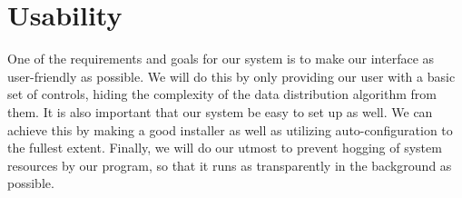 \section{Usability}
	One of the requirements and goals for our system is to make our interface as user-friendly as possible.  We will do this by only providing our user with a basic set of controls, hiding the complexity of the data distribution algorithm from them.  It is also important that our system be easy to set up as well.  We can achieve this by making a good installer as well as utilizing auto-configuration to the fullest extent.  Finally, we will do our utmost to prevent hogging of system resources by our program, so that it runs as transparently in the background as possible.
